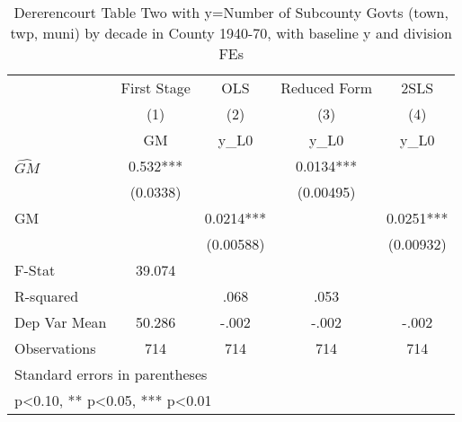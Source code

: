 \begin{table}[htbp]\centering
\def\sym#1{\ifmmode^{#1}\else\(^{#1}\)\fi}
\caption{Dererencourt Table Two with y=Number of Subcounty Govts (town, twp, muni) by decade in County 1940-70, with baseline y and division FEs}
\begin{tabular}{l*{4}{c}}
\toprule
                    & First Stage   &         OLS   &Reduced Form   &        2SLS   \\
                    &\multicolumn{1}{c}{(1)}&\multicolumn{1}{c}{(2)}&\multicolumn{1}{c}{(3)}&\multicolumn{1}{c}{(4)}\\
                    &\multicolumn{1}{c}{GM}&\multicolumn{1}{c}{y\_L0}&\multicolumn{1}{c}{y\_L0}&\multicolumn{1}{c}{y\_L0}\\
\midrule
$\hat{GM}$          &       0.532***&               &      0.0134***&               \\
                    &    (0.0338)   &               &   (0.00495)   &               \\
\addlinespace
GM                  &               &      0.0214***&               &      0.0251***\\
                    &               &   (0.00588)   &               &   (0.00932)   \\
\midrule
F-Stat              &      39.074   &               &               &               \\
R-squared           &               &        .068   &        .053   &               \\
Dep Var Mean        &      50.286   &       -.002   &       -.002   &       -.002   \\
Observations        &         714   &         714   &         714   &         714   \\
\bottomrule
\multicolumn{5}{l}{\footnotesize Standard errors in parentheses}\\
\multicolumn{5}{l}{\footnotesize * p<0.10, ** p<0.05, *** p<0.01}\\
\end{tabular}
\end{table}
